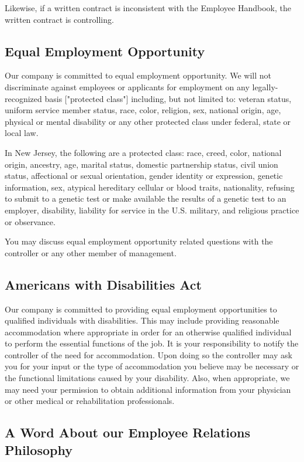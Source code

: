 \documentclass{book}
\begin{document}
Likewise, if a written contract is inconsistent with the Employee Handbook, the written contract is controlling.

\subsection{Equal Employment Opportunity}

Our company is committed to equal employment opportunity. We will not discriminate against employees or applicants for employment on any legally-recognized basis ["protected class"] including, but not limited to: veteran status, uniform service member status, race, color, religion, sex, national origin, age, physical or mental disability or any other protected class under federal, state or local law.

In New Jersey, the following are a protected class: race, creed, color, national origin, ancestry, age, marital status, domestic partnership status, civil union status, affectional or sexual orientation, gender identity or expression, genetic information, sex, atypical hereditary cellular or blood traits, nationality, refusing to submit to a genetic test or make available the results of a genetic test to an employer, disability, liability for service in the U.S. military, and religious practice or observance.

You may discuss equal employment opportunity related questions with the controller or any other member of management.

\subsection{Americans with Disabilities Act}

Our company is committed to providing equal employment opportunities to qualified individuals with disabilities. This may include providing reasonable accommodation where appropriate in order for an otherwise qualified individual to perform the essential functions of the job. It is your responsibility to notify the controller of the need for accommodation. Upon doing so the controller may ask you for your input or the type of accommodation you believe may be necessary or the functional limitations caused by your disability. Also, when appropriate, we may need your permission to obtain additional information from your physician or other medical or rehabilitation professionals.

\subsection{A Word About our Employee Relations Philosophy}
\end{document}
